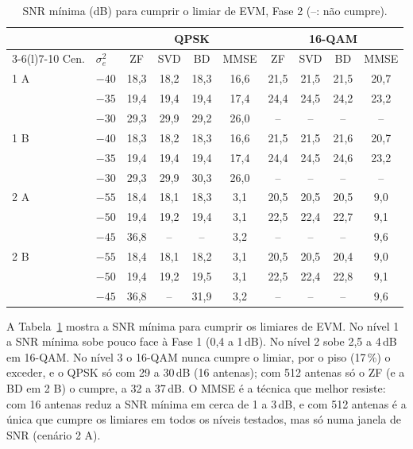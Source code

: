 \begin{table}[H]
  \centering
  \caption{SNR mínima (dB) para cumprir o limiar de EVM, Fase 2 (--: não cumpre).}
  \label{tab:snrmin}
  \footnotesize
  \begin{tabular}{@{}llcccccccc@{}}
    \toprule
    & & \multicolumn{4}{c}{QPSK} & \multicolumn{4}{c}{16-QAM} \\
    \cmidrule(lr){3-6}\cmidrule(l){7-10}
    Cen. & $\sigma_e^2$ & ZF & SVD & BD & MMSE & ZF & SVD & BD & MMSE \\
    \midrule
    1 A & $-40$ & 18,3 & 18,2 & 18,3 & 16,6 & 21,5 & 21,5 & 21,5 & 20,7 \\
     & $-35$ & 19,4 & 19,4 & 19,4 & 17,4 & 24,4 & 24,5 & 24,2 & 23,2 \\
     & $-30$ & 29,3 & 29,9 & 29,2 & 26,0 & -- & -- & -- & -- \\
    1 B & $-40$ & 18,3 & 18,2 & 18,3 & 16,6 & 21,5 & 21,5 & 21,6 & 20,7 \\
     & $-35$ & 19,4 & 19,4 & 19,4 & 17,4 & 24,4 & 24,5 & 24,6 & 23,2 \\
     & $-30$ & 29,3 & 29,9 & 30,3 & 26,0 & -- & -- & -- & -- \\
    2 A & $-55$ & 18,4 & 18,1 & 18,3 & 3,1 & 20,5 & 20,5 & 20,5 & 9,0 \\
     & $-50$ & 19,4 & 19,2 & 19,4 & 3,1 & 22,5 & 22,4 & 22,7 & 9,1 \\
     & $-45$ & 36,8 & -- & -- & 3,2 & -- & -- & -- & 9,6 \\
    2 B & $-55$ & 18,4 & 18,1 & 18,2 & 3,1 & 20,5 & 20,5 & 20,4 & 9,0 \\
     & $-50$ & 19,4 & 19,2 & 19,5 & 3,1 & 22,5 & 22,4 & 22,8 & 9,1 \\
     & $-45$ & 36,8 & -- & 31,9 & 3,2 & -- & -- & -- & 9,6 \\
    \bottomrule
  \end{tabular}
\end{table}

A Tabela~\ref{tab:snrmin} mostra a SNR mínima para cumprir os limiares de EVM. No nível 1 a SNR mínima sobe pouco face à Fase 1 (0,4 a 1\,dB). No nível 2 sobe 2,5 a 4\,dB em 16-QAM. No nível 3 o 16-QAM nunca cumpre o limiar, por o piso (17\,\%) o exceder, e o QPSK só com 29 a 30\,dB (16 antenas); com 512 antenas só o ZF (e a BD em 2 B) o cumpre, a 32 a 37\,dB. O MMSE é a técnica que melhor resiste: com 16 antenas reduz a SNR mínima em cerca de 1 a 3\,dB, e com 512 antenas é a única que cumpre os limiares em todos os níveis testados, mas só numa janela de SNR (cenário 2 A).

\clearpage
